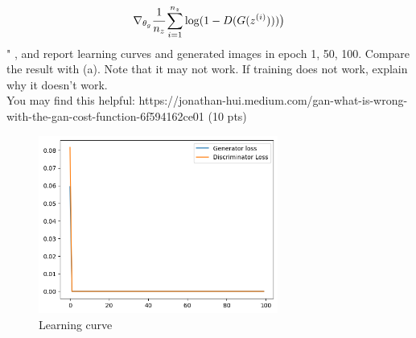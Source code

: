 \documentclass[a4paper]{article}
\theoremstyle{definition}
\begin{document}
\begin{enumerate} [label=(\alph*)]
		$$\nabla_{\theta_{g}}  \cfrac{1}{n_{z}}  \sum_{i=1}^{n_{z}}\log (1-D(G(z^{(i)})))\big )$$
		"
		, and report learning curves and generated images in epoch 1, 50, 100. Compare the result with (a). Note that it may not work. If training does not work, explain why it doesn't work. \\
        You may find this helpful: https://jonathan-hui.medium.com/gan-what-is-wrong-with-the-gan-cost-function-6f594162ce01
		\hfill (10 pts)
		
		\begin{figure}[H]
			\centering
			\includegraphics[width=0.7\textwidth]{gan_q1b_loss.png}
			\caption{Learning curve}
			\label{fig:gan_q1b_loss}
		\end{figure}
		

\end{enumerate}
\end{document}

